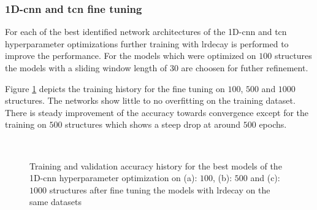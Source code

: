 \documentclass[conference]{IEEEtran}
\begin{document}

\subsubsection{1D-\gls{cnn} and \gls{tcn} fine tuning}
\label{sec:cnn_fine_tuning_results}

For each of the best identified network architectures of the 1D-\gls{cnn} and \gls{tcn} hyperparameter optimizations further training with \gls{lrdecay} is performed to improve the performance. For the models which were optimized on $ 100 $ structures the models with a sliding window length of $ 30 $ are choosen for futher refinement.

Figure \ref{fig:accuracy_adaptiveLR_CNN} depicts the training history for the fine tuning on $ 100 $, $ 500 $ and $ 1000 $ structures. The networks show little to no overfitting on the training dataset. There is steady improvement of the accuracy towards convergence except for the training on $ 500 $ structures which shows a steep drop at around $ 500 $ epochs.

\begin{figure}[htp]
	\centering
	\quad
	\\
	\caption{Training and validation accuracy history for the best models of the 1D-\gls{cnn} hyperparameter optimization on (a): $ 100 $, (b): $ 500 $ and (c): $ 1000 $ structures after fine tuning the models with \gls{lrdecay} on the same datasets}
	\label{fig:accuracy_adaptiveLR_CNN}
\end{figure}
\end{document}
